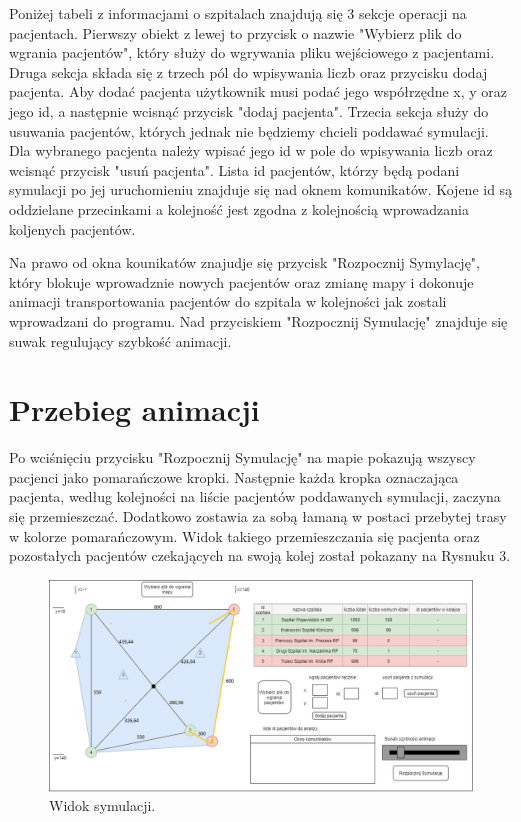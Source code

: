 \documentclass[10pt,a4paper]{article}
\begin{document}
Poniżej tabeli z informacjami o szpitalach znajdują się 3 sekcje operacji na pacjentach. Pierwszy obiekt z lewej to przycisk o nazwie "Wybierz plik do wgrania pacjentów", który służy do wgrywania pliku wejściowego z pacjentami. Druga sekcja składa się z trzech pól do wpisywania liczb oraz przycisku dodaj pacjenta. Aby dodać pacjenta użytkownik musi podać jego współrzędne x, y oraz jego id, a następnie wcisnąć przycisk "dodaj pacjenta". Trzecia sekcja służy do usuwania pacjentów, których jednak nie będziemy chcieli poddawać symulacji. Dla wybranego pacjenta należy wpisać jego id w pole do wpisywania liczb oraz wcisnąć przycisk "usuń pacjenta". Lista id pacjentów, którzy będą podani symulacji po jej uruchomieniu znajduje się nad oknem komunikatów. Kojene id są oddzielane przecinkami a kolejność jest zgodna z kolejnością wprowadzania koljenych pacjentów.

Na prawo od okna kounikatów znajudje się przycisk "Rozpocznij Symylację", który blokuje wprowadznie nowych pacjentów oraz zmianę mapy i dokonuje animacji transportowania pacjentów do szpitala w kolejności jak zostali wprowadzani do programu. Nad przyciskiem "Rozpocznij Symulację" znajduje się suwak regulujący szybkość animacji.

\section{Przebieg animacji}

Po wciśnięciu przycisku "Rozpocznij Symulację" na mapie pokazują wszyscy pacjenci jako pomarańczowe kropki. Następnie każda kropka oznaczająca pacjenta, według kolejności na liście pacjentów poddawanych symulacji, zaczyna się przemieszczać. Dodatkowo zostawia za sobą łamaną w postaci przebytej trasy w kolorze pomarańczowym. Widok takiego przemieszczania się pacjenta oraz pozostałych pacjentów czekających na swoją kolej został pokazany na Rysnuku 3.

\begin{figure}[h]
  \includegraphics[width=\linewidth]{./images/widok_symulacji.png}
  \caption{Widok symulacji.}
  \label{fig:GUIsym}
\end{figure}
\end{document}
